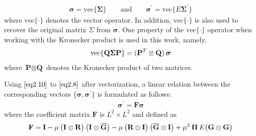 \documentclass[journal, one column]{IEEEtran}
\begin{document}
\begin{equation}\label{eq2.9}
\begin{split}
\boldsymbol{\sigma}= \text{vec}\{\boldsymbol{\Sigma}\} \hspace{2em} \text{and} \hspace{2em} \boldsymbol{\sigma^{'}}= \text{vec}\{E\boldsymbol{\Sigma}^{'}\}
\end{split}
\end{equation}
where $\text{vec}\{\cdot\}$ denotes the vector operator. In addition, $\text{vec}\{\cdot\}$ is also used to recover the original matrix $\Sigma$ from $\boldsymbol{\sigma}$. One property of the $\text{vec}\{\cdot\}$ operator when working with the Kronecker product \cite{12} is used in this work, namely,
\begin{equation}\label{eq2.10}
\begin{split}
\text{vec}\{\textbf{Q} \boldsymbol{\Sigma} \textbf{P}\}= ( \textbf{P}^{T} \otimes \textbf{Q} ) \hspace{0.2em} \boldsymbol{\sigma}
\end{split}
\end{equation}
where $\textbf{P} \otimes \textbf{Q}$ denotes the Kronecker product of two matrices.
\par
Using $\eqref{eq2.10}$ to $\eqref{eq2.8}$ after vectorization, a linear relation between the corresponding vectors $\{\boldsymbol{\sigma},\boldsymbol{\sigma}^{'}\}$ is formulated as follows:
\begin{equation}\label{eq2.11}
\begin{split}
\boldsymbol{\sigma}^{'}= \textbf{F} \boldsymbol{\sigma}
\end{split}
\end{equation}
where the coefficient matrix $\textbf{F}$ is $L^{2} \times L^{2}$ and defined as
\begin{equation}\label{eq2.12}
\begin{split}
\textbf{F} = \textbf{I} - \mu \hspace{0.2em} \big(\textbf{I} \otimes \textbf{R} \big) \hspace{0.2em} \big(\textbf{I} \otimes \overline{\textbf{G}} \big) -\mu \hspace{0.2em} \big( \textbf{R} \otimes \textbf{I} \big) \hspace{0.2em} \big( \overline{\textbf{G}} \otimes \textbf{I} \big) + \mu^{2} \hspace{0.2em} \boldsymbol{\Pi} \hspace{0.2em} E\big(\textbf{G} \otimes \textbf{G} \big)
\end{split}
\end{equation}
\end{document}
